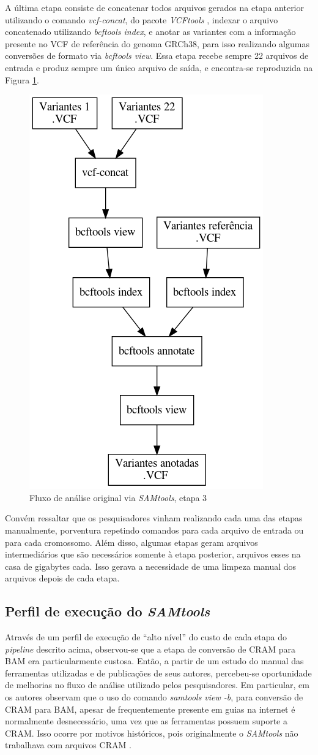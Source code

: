\documentclass[cic,tc]{iiufrgs}
\begin{document}
A última etapa consiste de concatenar todos arquivos gerados na etapa anterior
utilizando o comando \textit{vcf-concat}, do pacote
\textit{VCFtools} \cite{10.1093/bioinformatics/btr330}, indexar o arquivo concatenado
utilizando \textit{bcftools index}, e anotar as variantes com a informação
presente no VCF de referência do genoma GRCh38, para isso realizando algumas
conversões de formato via \textit{bcftools view}. Essa etapa recebe sempre 22
arquivos de entrada e produz sempre um único arquivo de saída, e encontra-se
reproduzida na Figura \ref{fig:stage3_orig}.

\begin{figure}
  \caption{Fluxo de análise original via \textit{SAMtools}, etapa 3}
    \begin{center}
      \includegraphics[width=0.30\linewidth]{img/stage3_orig.png}
    \end{center}
    \label{fig:stage3_orig}
\end{figure}

Convém ressaltar que os pesquisadores vinham realizando cada uma das etapas
manualmente, porventura repetindo comandos para cada arquivo de entrada ou para
cada cromossomo. Além disso, algumas etapas geram arquivos intermediários que
são necessários somente à etapa posterior, arquivos esses na casa de gigabytes
cada. Isso gerava a necessidade de uma limpeza manual dos arquivos depois de
cada etapa.

\subsection{Perfil de execução do \textit{SAMtools}}

Através de um perfil de execução de ``alto nível'' do custo de cada etapa do
\textit{pipeline} descrito acima, observou-se que a etapa de conversão de CRAM
para BAM era particularmente custosa. Então, a partir de um estudo do manual
das ferramentas utilizadas e de publicações de seus autores, percebeu-se
oportunidade de melhorias no fluxo de análise utilizado pelos pesquisadores. Em
particular, em \cite{danecek2021twelve} os autores observam que o uso do
comando \textit{samtools view -b}, para conversão de CRAM para BAM, apesar de
frequentemente presente em guias na internet é normalmente desnecessário, uma
vez que as ferramentas possuem suporte a CRAM. Isso ocorre por motivos
históricos, pois originalmente o \textit{SAMtools} não trabalhava com arquivos
CRAM \cite{danecek2021twelve}.
\end{document}
